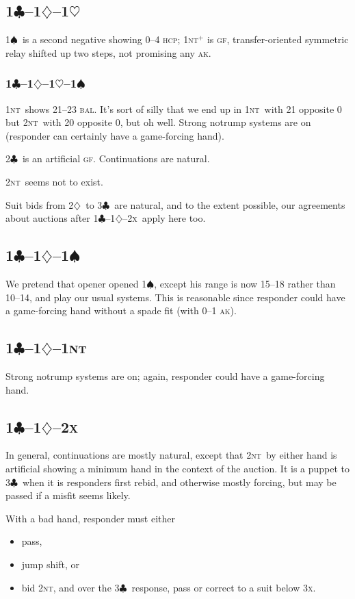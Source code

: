 \documentclass{report}
\newcommand{\hcp}{\textsc{hcp}}
\newcommand{\bal}{\textsc{bal}}
\newcommand{\ak}{\textsc{ak}}
\newcommand{\gf}{\textsc{gf}}
\renewcommand{\c}{\ensuremath{\clubsuit}}
\renewcommand{\d}{\ensuremath{\diamondsuit}}
\newcommand{\h}{\ensuremath{\heartsuit}}
\newcommand{\s}{\ensuremath{\spadesuit}}
\newcommand{\nt}{\textsc{nt}}
\newcommand{\x}{\textsc{x}}
\newcommand{\+}{\ensuremath{^+}}
\begin{document}
\subsection{1\c--1\d--1\h}
1\s\ is a second negative showing 0--4 \hcp; 1\nt\+ is \gf,
transfer-oriented symmetric relay shifted up two steps, not promising
any \ak.

\subsubsection{1\c--1\d--1\h--1\s}
1\nt\ shows 21--23 \bal.  It's sort of silly that we end up in
1\nt\ with 21 opposite 0 but 2\nt\ with 20 opposite 0, but oh well.
Strong notrump systems are on (responder can certainly have a
game-forcing hand).

2\c\ is an artificial \gf.  Continuations are natural.

2\nt\ seems not to exist.

Suit bids from 2\d\ to 3\c\ are natural, and to the extent possible,
our agreements about auctions after 1\c--1\d--2\x\ apply here too.

\subsection{1\c--1\d--1\s}
We pretend that opener opened 1\s, except his range is now 15--18
rather than 10--14, and play our usual systems.  This is reasonable
since responder could have a game-forcing hand without a spade fit
(with 0--1 \ak).

\subsection{1\c--1\d--1\nt}
Strong notrump systems are on; again, responder could have a
game-forcing hand.

\subsection{1\c--1\d--2\x}
In general, continuations are mostly natural, except that 2\nt\ by
either hand is artificial showing a minimum hand in the context of the
auction.  It is a puppet to 3\c\ when it is responders first rebid, and
otherwise mostly forcing, but may be passed if a misfit seems likely.

With a bad hand, responder must either
\begin{itemize}
\item pass,
\item jump shift, or
\item bid 2\nt, and over the 3\c\ response, pass or correct to a suit
  below 3\x.
\end{itemize}
\end{document}
